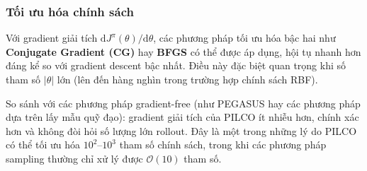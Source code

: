 \subsubsection{Tối ưu hóa chính sách}
\label{SUB_SUB_SEC_policy_optimization}

Với gradient giải tích $\mathrm{d}J^\pi(\theta)/\mathrm{d}\theta$, các phương pháp tối ưu hóa bậc hai như \textbf{Conjugate Gradient (CG)} hay \textbf{BFGS} có thể được áp dụng, hội tụ nhanh hơn đáng kể so với gradient descent bậc nhất. Điều này đặc biệt quan trọng khi số tham số $\lvert\theta\rvert$ lớn (lên đến hàng nghìn trong trường hợp chính sách RBF).
\medskip

\begin{nx}
    So sánh với các phương pháp gradient-free (như PEGASUS \cite{Ng_Jordan_2000} hay các phương pháp dựa trên lấy mẫu quỹ đạo): gradient giải tích của PILCO ít nhiễu hơn, chính xác hơn và không đòi hỏi số lượng lớn rollout. Đây là một trong những lý do PILCO có thể tối ưu hóa $10^2$--$10^3$ tham số chính sách, trong khi các phương pháp sampling thường chỉ xử lý được $\mathcal{O}(10)$ tham số.
\end{nx}
\medskip
